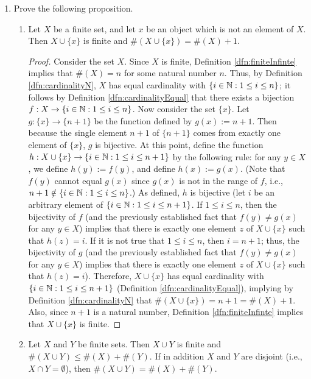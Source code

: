 \documentclass[../main.tex]{subfiles}
\begin{document}
\begin{enumerate}[ref={\thesection.\arabic*}]
\begin{proof}
    \end{proof}
    \item \label{exr:3.6.4}Prove the following proposition.
    \begin{prp}
        \leavevmode
        \begin{enumerate}[label={\textup{(}\alph*\textup{)}},ref={\theenumi\alph*}]
            \item \label{exr:3.6.4a}Let $X$ be a finite set, and let $x$ be an object which is not an element of $X$. Then $X\cup\{x\}$ is finite and $\#(X\cup\{x\})=\#(X)+1$.
            \begin{proof}
                Consider the set $X$. Since $X$ is finite, Definition \ref{dfn:finiteInfinte} implies that $\#(X)=n$ for some natural number $n$. Thus, by Definition \ref{dfn:cardinalityN}, $X$ has equal cardinality with $\{i\in\mathbb{N}:1\leq i\leq n\}$; it follows by Definition \ref{dfn:cardinalityEqual} that there exists a bijection $f:X\to\{i\in\mathbb{N}:1\leq i\leq n\}$. Now consider the set $\{x\}$. Let $g:\{x\}\to\{n+1\}$ be the function defined by $g(x):=n+1$. Then because the single element $n+1$ of $\{n+1\}$ comes from exactly one element of $\{x\}$, $g$ is bijective. At this point, define the function $h:X\cup\{x\}\to\{i\in\mathbb{N}:1\leq i\leq n+1\}$ by the following rule: for any $y\in X$, we define $h(y):=f(y)$, and define $h(x):=g(x)$. (Note that $f(y)$ cannot equal $g(x)$ since $g(x)$ is not in the range of $f$, i.e., $n+1\notin\{i\in\mathbb{N}:1\leq i\leq n\}$.) As defined, $h$ is bijective (let $i$ be an arbitrary element of $\{i\in\mathbb{N}:1\leq i\leq n+1\}$. If $1\leq i\leq n$, then the bijectivity of $f$ (and the previously established fact that $f(y)\neq g(x)$ for any $y\in X$) implies that there is exactly one element $z$ of $X\cup\{x\}$ such that $h(z)=i$. If it is not true that $1\leq i\leq n$, then $i=n+1$; thus, the bijectivity of $g$ (and the previously established fact that $f(y)\neq g(x)$ for any $y\in X$) implies that there is exactly one element $z$ of $X\cup\{x\}$ such that $h(z)=i$). Therefore, $X\cup\{x\}$ has equal cardinality with $\{i\in\mathbb{N}:1\leq i\leq n+1\}$ (Definition \ref{dfn:cardinalityEqual}), implying by Definition \ref{dfn:cardinalityN} that $\#(X\cup\{x\})=n+1=\#(X)+1$. Also, since $n+1$ is a natural number, Definition \ref{dfn:finiteInfinte} implies that $X\cup\{x\}$ is finite.
            \end{proof}
            \item \label{exr:3.6.4b}Let $X$ and $Y$ be finite sets. Then $X\cup Y$ is finite and $\#(X\cup Y)\leq\#(X)+\#(Y)$. If in addition $X$ and $Y$ are disjoint (i.e., $X\cap Y=\emptyset$), then $\#(X\cup Y)=\#(X)+\#(Y)$.

\end{enumerate}
\end{prp}
\end{enumerate}
\end{document}
